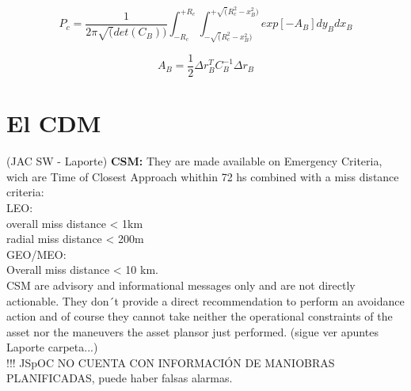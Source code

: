 \begin{equation}
P_{c} = \frac{1}{2 \pi \sqrt(det(C_{B}))} \int_{-R_{c}}^{+R_{c}} \int_{-\sqrt(R^{2}_{c}-x^{2}_{B})}^{+\sqrt(R^{2}_{c}-x^{2}_{B})} exp [- A_{B}] dy_{B} dx_{B}
\end{equation}

\begin{equation}
A_{B}=\frac{1}{2}\Delta r^{T}_{B} C^{-1}_{B} \Delta r_{B}
\end{equation}

\section{El CDM}
(JAC SW - Laporte)
{\bf{CSM:}} They are made available on Emergency Criteria, wich are Time of Closest Approach whithin 72 hs combined with a miss distance criteria:\\
LEO:\\
overall miss distance < 1km\\
radial miss distance < 200m\\
GEO/MEO:\\
Overall miss distance < 10 km.\\

CSM are advisory and informational messages only and are not directly actionable. They don´t provide a direct recommendation to perform an avoidance action and of course they cannot take neither the operational constraints of the asset nor the maneuvers the asset plansor just performed. (sigue ver apuntes Laporte carpeta...)\\

!!! JSpOC NO CUENTA CON INFORMACI\'ON DE MANIOBRAS PLANIFICADAS, puede haber falsas alarmas.\\




